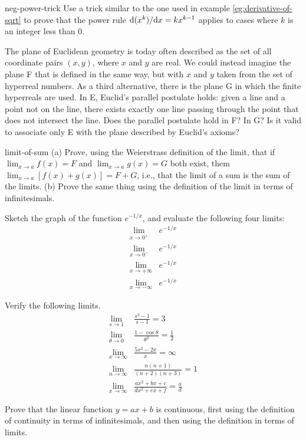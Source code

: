 \begin{hwsection}
\begin{hwwithsoln}[2]{neg-power-trick}
Use a trick similar to the one used in example \ref{eg:derivative-of-sqrt} to prove that the power
rule $\textup{d}(x^k)/\textup{d} x=kx^{k-1}$ applies to cases where $k$ is an integer less than 0.
\end{hwwithsoln}

\begin{hw}[2]
The plane of Euclidean geometry is today often described as the set of all coordinate pairs $(x,y)$, where
$x$ and $y$ are real. We could instead imagine the plane F that is defined in the same way, but with $x$ and $y$ taken from the
set of hyperreal numbers. As a third alternative, there is the plane G in which the finite hyperreals are used.
In E, Euclid's parallel postulate holds: given a line and a point not on the line, there exists exactly one line passing
through the point that does not intersect the line. Does the parallel postulate hold in F? In G?
Is it valid to associate only E with the plane described by Euclid's axioms?
\end{hw}

\begin{hwwithsoln}{limit-of-sum}
(a) Prove, using the Weierstrass definition of the limit, that if $\lim_{x\rightarrow a} f(x) = F$ and $\lim_{x\rightarrow a} g(x) = G$ both exist,
them $\lim_{x\rightarrow a} [f(x)+g(x)] = F+G$, i.e., that the limit of a sum is the sum of the limits. (b) Prove the same thing using the
definition of the limit in terms of infinitesimals.
\end{hwwithsoln}

\begin{hw}
Sketch the graph of the function $e^{-1/x}$, and evaluate the following four limits:
\begin{align*}
  \lim_{x\rightarrow 0^{+}} & e^{-1/x} \\
  \lim_{x\rightarrow 0^{-}} & e^{-1/x} \\
  \lim_{x\rightarrow +\infty} & e^{-1/x} \\
  \lim_{x\rightarrow -\infty} & e^{-1/x} 
\end{align*}
\end{hw}

\begin{hw}
Verify the following limits.
\begin{align*}
  \lim_{s\rightarrow 1} & \frac{s^3-1}{s-1} = 3 \\
  \lim_{\theta\rightarrow 0} & \frac{1-\cos\theta}{\theta^2} = \frac{1}{2} \\
  \lim_{x\rightarrow \infty} & \frac{5x^2-2x}{x} = \infty \\
  \lim_{n\rightarrow \infty} & \frac{n(n+1)}{(n+2)(n+3)} = 1 \\
  \lim_{x\rightarrow \infty} & \frac{ax^2+bx+c}{dx^2+ex+f} = \frac{a}{d}
\end{align*}
\granville
\end{hw}

\begin{hw}
Prove that the linear function $y=ax+b$ is continuous, first using the definition of
continuity in terms of infinitesimals, and then using the definition in terms of
limits.
\end{hw}

\end{hwsection}

